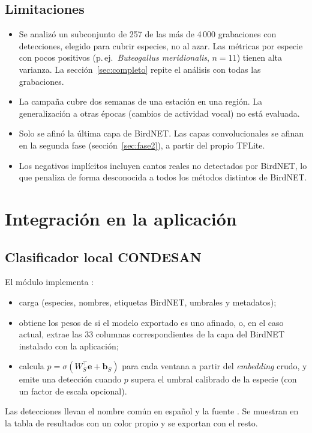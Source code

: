 \documentclass[11pt,a4paper]{article}
\newcommand{\spp}[1]{\textit{#1}}
\begin{document}
\subsection{Limitaciones}
\begin{itemize}
  \item Se analizó un subconjunto de 257 de las más de 4\,000 grabaciones con detecciones, elegido para cubrir especies, no al azar. Las métricas por especie con pocos
        positivos (p.\,ej.\ \spp{Buteogallus meridionalis}, $n = 11$) tienen alta varianza. La sección~\ref{sec:completo} repite el análisis con todas las grabaciones.
  \item La campaña cubre dos semanas de una estación en una región. La generalización a otras épocas (cambios de actividad vocal) no está evaluada.
  \item Solo se afinó la última capa de BirdNET. Las capas convolucionales se afinan en la segunda fase (sección~\ref{sec:fase2}), a partir del propio TFLite.
  \item Los negativos implícitos incluyen cantos reales no detectados por BirdNET, lo que penaliza de forma desconocida a todos los métodos distintos de BirdNET.
\end{itemize}

\section{Integración en la aplicación}
\subsection{Clasificador local CONDESAN}
El módulo  implementa :
\begin{itemize}
  \item carga  (especies, nombres, etiquetas BirdNET, umbrales y metadatos);
  \item obtiene los pesos de  si el modelo exportado es uno afinado, o, en el caso actual, extrae las 33 columnas
        correspondientes de la capa  del BirdNET instalado con la aplicación;
  \item calcula $p = \sigma(W_S^\top \mathbf{e} + \mathbf{b}_S)$ para cada ventana a partir del \emph{embedding} crudo, y emite una detección cuando
        $p$ supera el umbral calibrado de la especie (con un factor de escala opcional).
\end{itemize}
Las detecciones llevan el nombre común en español y la fuente . Se muestran en la tabla de resultados con un color propio y se
exportan con el resto.
\end{document}
